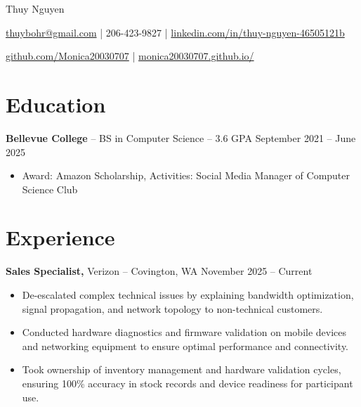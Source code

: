 \documentclass[11pt]{article}       %
\begin{document}
\centerline{\Huge Thuy Nguyen}

\vspace{5pt}

\centerline{\href{mailto:thuybohr@gmail.com}{thuybohr@gmail.com} | 206-423-9827 |
\href{https://www.linkedin.com/in/thuy-nguyen-46505121b/}{linkedin.com/in/thuy-nguyen-46505121b}}

\centerline{\href{https://github.com/Monica20030707}{github.com/Monica20030707} | 
\href{https://monica20030707.github.io/}{monica20030707.github.io/}} 

\vspace{-9pt}

\section*{Education}
\textbf{Bellevue College} -- BS in Computer Science -- 3.6 GPA \hfill September 2021 -- June 2025\\
\vspace{-9pt}
\begin{itemize}
  \item Award: Amazon Scholarship, Activities: Social Media Manager of Computer Science Club
\end{itemize}

\vspace{-18.5pt}

\section*{Experience}

\textbf{Sales Specialist,} {Verizon} -- Covington, WA \hfill November 2025 -- Current \\
\vspace{-9pt}
\begin{itemize}
  \item De-escalated complex technical issues by explaining bandwidth optimization, signal propagation, and network topology to non-technical customers.
  \item Conducted hardware diagnostics and firmware validation on mobile devices and networking equipment to ensure optimal performance and connectivity.
  \item Took ownership of inventory management and hardware validation cycles, ensuring 100\% accuracy in stock records and device readiness for participant use.
\end{itemize}
\end{document}
